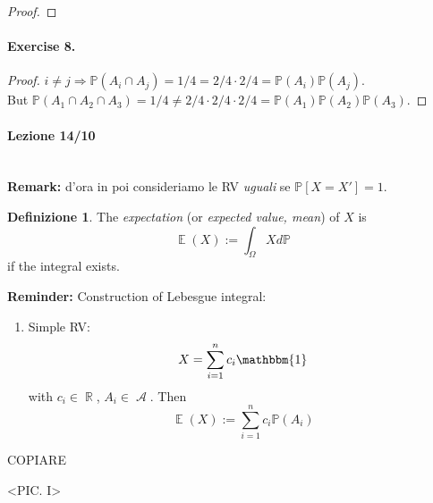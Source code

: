 \documentclass[12pt,a4paper]{report}
\theoremstyle{definition}
\newtheorem{defn}[teo]{Definizione}  %
\theoremstyle{num.custom-title}
\DeclareMathOperator{\A}{\mathcal{A}}
\DeclareMathOperator{\R}{\mathbb{R}}
\DeclareMathOperator{\E}{\mathbb{E}}
\DeclareMathOperator{\imp}{\Rightarrow}
\DeclareMathOperator{\sse}{\subseteq}
\renewcommand{\P}{\mathbb{P}}
\renewcommand{\1}{\mathbbm{1}}
\begin{document}
\begin{proof}
\end{proof}

\paragraph{Exercise 8.} 
\begin{proof}
$i \ne j \imp \P(A_i \cap A_j) = 1/4 = 2/4 \cdot 2/4 = \P(A_i) \P(A_j).$\\
But $\P(A_1 \cap A_2 \cap A_3)=1/4 \ne 2/4 \cdot 2/4 \cdot 2/4 = \P(A_1) \P(A_2) \P(A_3)$.
\end{proof}




\paragraph{Lezione 14/10}\ \\
\textbf{Remark:} d'ora in poi consideriamo le RV \emph{uguali} se $\P[X=X']=1$.

\begin{defn}
The \emph{expectation} (or \emph{expected value, mean}) of $X$ is 
\[
\E(X):=\int_{\Omega} X d\P
\]
if the integral exists.
\end{defn}

\textbf{Reminder:} Construction of Lebesgue integral:
\begin{enumerate}
\item Simple RV:
\[
X=\sum_{i=1}^n c_i \1
\]
with $c_i \in \R$, $A_i \in \A$. Then
\[
\E(X):=\sum_{i=1}^n c_i \P(A_i)
\]
\end{enumerate}

COPIARE


<PIC. I>
\end{document}

